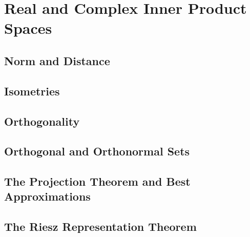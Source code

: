 \chapter{Real and Complex Inner Product Spaces}
\section{Norm and Distance}
\section{Isometries}
\section{Orthogonality}
\section{Orthogonal and Orthonormal Sets}
\section{The Projection Theorem and Best Approximations}
\section{The Riesz Representation Theorem}


